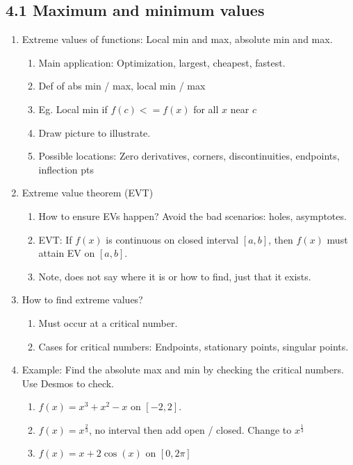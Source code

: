 \documentclass{article}
\begin{document}
\subsection{4.1 Maximum and minimum values}

\begin{enumerate}
\item Extreme values of functions: Local min and max, absolute min and max.
\begin{enumerate}
\item Main application: Optimization, largest, cheapest, fastest.
\item Def of abs min / max, local min / max
\item Eg. Local min if $f(c) <= f(x)$ for all $x$ near $c$
\item Draw picture to illustrate.
\item Possible locations: Zero derivatives, corners, discontinuities, endpoints, inflection pts
\end{enumerate}

\item Extreme value theorem (EVT)
\begin{enumerate}
\item How to ensure EVs happen? Avoid the bad scenarios: holes, asymptotes.
\item EVT: If $f(x)$ is continuous on closed interval $[a,b]$, then $f(x)$ must attain EV on $[a,b]$.
\item Note, does not say where it is or how to find, just that it exists.
\end{enumerate}

\item How to find extreme values?
\begin{enumerate}
\item Must occur at a critical number.
\item Cases for critical numbers: Endpoints, stationary points, singular points.
\end{enumerate}


\item Example: Find the absolute max and min by checking the critical numbers. Use Desmos to check.
\begin{enumerate}
\item $f(x) = x^3+x^2-x$ on $[-2,2]$. 
\item $f(x) = x^{\frac{2}{3}}$, no interval then add open / closed. Change to $x^\frac{1}{3}$
\item $f(x) = x + 2\cos(x)$ on $[0,2\pi]$
\end{enumerate}
\end{enumerate}	
\end{document}
